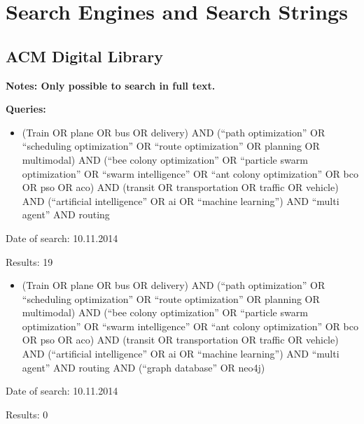\chapter{Search Engines and Search Strings}
\section{ACM Digital Library}
\textbf{Notes: Only possible to search in full text.} 
\par
\textbf{Queries:}
\begin{itemize}
\item (Train OR plane OR bus OR delivery) AND (``path optimization'' OR ``scheduling optimization'' OR ``route optimization'' OR planning OR multimodal) AND (``bee colony optimization'' OR ``particle swarm optimization'' OR ``swarm intelligence'' OR ``ant colony optimization'' OR bco OR pso OR aco) AND (transit OR transportation OR traffic OR vehicle) AND (``artificial intelligence'' OR ai OR ``machine learning'') AND ``multi agent'' AND routing
\end{itemize}
\par Date of search: 10.11.2014
\par Results: 19
\begin{itemize}
\item (Train OR plane OR bus OR delivery) AND (``path optimization'' OR ``scheduling optimization'' OR ``route optimization'' OR planning OR multimodal) AND (``bee colony optimization'' OR ``particle swarm optimization'' OR ``swarm intelligence'' OR ``ant colony optimization'' OR bco OR pso OR aco) AND (transit OR transportation OR traffic OR vehicle) AND (``artificial intelligence'' OR ai OR ``machine learning'') AND ``multi agent'' AND routing AND (``graph database'' OR neo4j)
\end{itemize}
\par Date of search: 10.11.2014
\par Results: 0


